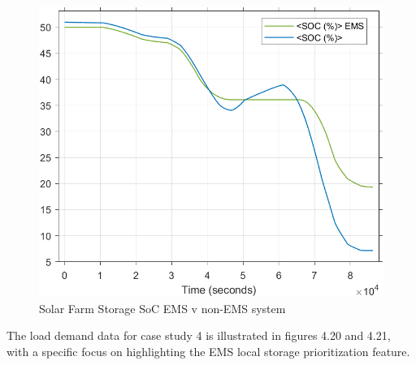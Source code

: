 \begin{figure}[H]
	\centering
	\includegraphics[totalheight=8cm]{Figures/solar farm storage soc ems v non-ems system.png}
	\caption{Solar Farm Storage SoC EMS v non-EMS system}
\end{figure}
The load demand data for case study 4 is illustrated in figures 4.20 and 4.21, with a specific focus on highlighting the EMS local storage prioritization feature.

